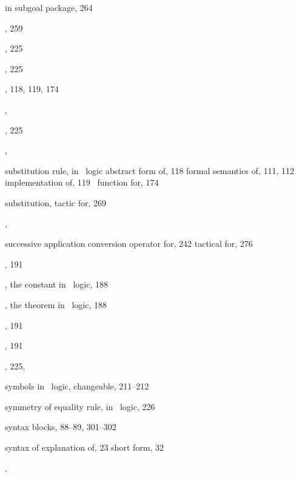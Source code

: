 \begin{theindex}
    \subitem in subgoal package, 264
  \item {}, 259
  \item {}, 225
  \item {}, 225
  \item {}, 118, 119, 174
  \item {}, 
  \item {}, 225
  \item {}, 
  \item substitution rule, in \HOL\ logic
    \subitem abstract form of, 118
    \subitem formal semantics of, 111, 112
    \subitem implementation of, 119
    \subitem \ML\ function for, 174
  \item substitution, tactic for, 269
  \item {}, 
  \item successive application
    \subitem conversion operator for, 242
    \subitem tactical for, 276
  \item {}, 191
  \item {}, the constant in \HOL\ logic, 188
  \item {}, the theorem in \HOL\ logic, 188
  \item {}, 191
  \item {}, 191
  \item {}, 225, 
  \item symbols in \HOL\ logic, changeable, 211--212
  \item symmetry of equality rule, in \HOL\ logic, 226
  \item syntax blocks, 88--89, 301--302
  \item syntax of \ML
    \subitem explanation of, 23
    \subitem short form, 32
  \item {}, 

  \indexspace


\end{theindex}
